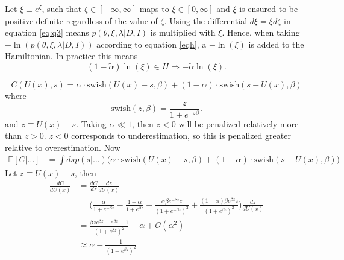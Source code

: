\begin{example}
	Let $\xi \equiv e^\zeta$, such that $\zeta\in [-\infty,\infty]$ maps to $\xi\in[0,\infty]$ and $\xi$ is ensured to be positive definite regardless of the value of $\zeta$. Using the differential $d\xi =  \xi d\zeta$ in equation \eqref{eq:q3} means $p(\theta,\xi,\lambda|D,I)$ is multiplied with $\xi$. Hence, when taking $-\ln(p(\theta,\xi,\lambda|D,I))$ according to equation \eqref{eqh}, a $-\ln(\xi)$ is added to the Hamiltonian. In practice this means
	\begin{equation}
		(1-\tilde{\alpha})\ln(\xi)\in H\Rightarrow -\tilde{\alpha}\ln(\xi).
	\end{equation} 	
\end{example}

\begin{example}
	\begin{equation}
		C(U(x), s) = \alpha\cdot \text{swish}(U(x)-s,\beta)+(1-\alpha)\cdot\text{swish}(s-U(x),\beta)
	\end{equation}
	where
	\begin{equation}
		\text{swish}(z,\beta) = \frac{z}{1+e^{-z\beta}}.
	\end{equation}
	and $z\equiv U(x)-s$. Taking $\alpha \ll 1$, then $z<0$ will be penalized relatively more than $z>0$. $z<0$ corresponds to underestimation, so this is penalized greater relative to overestimation. Now
	\begin{equation}
		\begin{split}
			\mathbb{E}[C|\dots ] & =\int ds p(s|\dots) \bigg(\alpha\cdot \text{swish}(U(x)-s,\beta)+(1-\alpha)\cdot\text{swish}(s-U(x),\beta)\bigg)
		\end{split}
	\end{equation}
	Let $z\equiv U(x)-s$, then
	\begin{equation}
		\begin{split}
			\frac{dC}{dU(x)} & = \frac{dC}{dz}\frac{dz}{dU(x)}\\
			& = \bigg(\frac{\alpha}{1+e^{-\beta z}}-\frac{1-\alpha}{1+e^{\beta z}}+\frac{\alpha\beta e^{-\beta z}z}{(1+e^{-\beta z})^2}+\frac{(1-\alpha)\beta e^{\beta z}z}{(1+e^{\beta z})^2}\bigg)\frac{dz}{dU(x)}\\
			&= \frac{\beta z e^{\beta z}-e^{\beta z}-1}{(1+e^{\beta z})^2}+\alpha+\mathcal{O}(\alpha^2)\\
			&\approx  \alpha -\frac{1}{(1+e^{\beta z})^2}
		\end{split}
	\end{equation}

\end{example}
